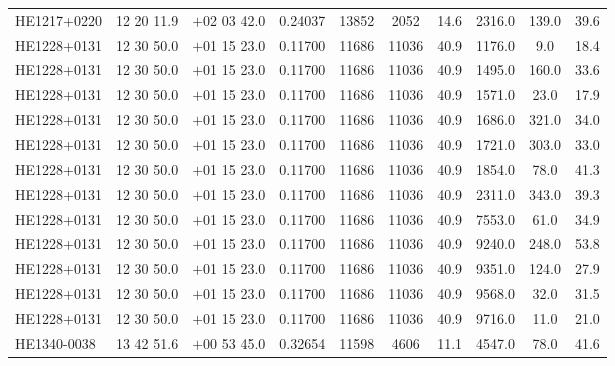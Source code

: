 \begin{landscape}
\begin{center}
\begin{longtable}{l c c c c c c c c c}
HE1217+0220  &             12 20 11.9  &         $+$02 03 42.0  &       0.24037  & 13852  &   2052  &       14.6  &      2316.0  &  139.0  &  39.6  \\
HE1228+0131  &             12 30 50.0  &         $+$01 15 23.0  &       0.11700  & 11686  &   11036  &      40.9  &      1176.0  &  9.0  &    18.4  \\
HE1228+0131  &             12 30 50.0  &         $+$01 15 23.0  &       0.11700  & 11686  &   11036  &      40.9  &      1495.0  &  160.0  &  33.6  \\
HE1228+0131  &             12 30 50.0  &         $+$01 15 23.0  &       0.11700  & 11686  &   11036  &      40.9  &      1571.0  &  23.0  &   17.9  \\
HE1228+0131  &             12 30 50.0  &         $+$01 15 23.0  &       0.11700  & 11686  &   11036  &      40.9  &      1686.0  &  321.0  &  34.0  \\
HE1228+0131  &             12 30 50.0  &         $+$01 15 23.0  &       0.11700  & 11686  &   11036  &      40.9  &      1721.0  &  303.0  &  33.0  \\
HE1228+0131  &             12 30 50.0  &         $+$01 15 23.0  &       0.11700  & 11686  &   11036  &      40.9  &      1854.0  &  78.0  &   41.3  \\
HE1228+0131  &             12 30 50.0  &         $+$01 15 23.0  &       0.11700  & 11686  &   11036  &      40.9  &      2311.0  &  343.0  &  39.3  \\
HE1228+0131  &             12 30 50.0  &         $+$01 15 23.0  &       0.11700  & 11686  &   11036  &      40.9  &      7553.0  &  61.0  &   34.9  \\
HE1228+0131  &             12 30 50.0  &         $+$01 15 23.0  &       0.11700  & 11686  &   11036  &      40.9  &      9240.0  &  248.0  &  53.8  \\
HE1228+0131  &             12 30 50.0  &         $+$01 15 23.0  &       0.11700  & 11686  &   11036  &      40.9  &      9351.0  &  124.0  &  27.9  \\
HE1228+0131  &             12 30 50.0  &         $+$01 15 23.0  &       0.11700  & 11686  &   11036  &      40.9  &      9568.0  &  32.0  &   31.5  \\
HE1228+0131  &             12 30 50.0  &         $+$01 15 23.0  &       0.11700  & 11686  &   11036  &      40.9  &      9716.0  &  11.0  &   21.0  \\
HE1340-0038  &             13 42 51.6  &         $+$00 53 45.0  &       0.32654  & 11598  &   4606  &       11.1  &      4547.0  &  78.0  &   41.6  \\

\end{longtable}
\end{center}
\end{landscape}
